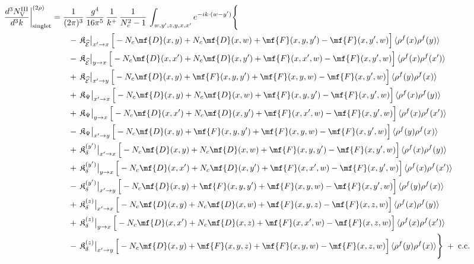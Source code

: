 {\begin{align}
\frac{d^{3}N^{\rm III}_{\rm V}}{d^{3}k}\bigg|^{(2\rho)}_{\rm singlet}&=\frac{1}{(2\pi)^{3}}\,\frac{g^{4}}{16\pi^{5}}\,\frac{1}{k^{+}}\,\frac{1}{N_{c}^{2}-1}\,\int_{w,y',z,y,x,x'}e^{-ik\cdot(w-y')}\Bigg\{\notag\\
&\qquad -\,\mathfrak{K}_{\widehat{\mathcal{E}}}\big|_{x'\to x}\,\Big[-N_{c}\mf{D}(x,y)+N_{c}\mf{D}(x,w)+\mf{F}(x,y,y')-\mf{F}(x,y',w)\Big]\,\langle\rho^{f}(x)\rho^{f}(y)\rangle\notag\\
&\qquad -\,\mathfrak{K}_{\widehat{\mathcal{E}}}\big|_{y\to x}\,\Big[-N_{c}\mf{D}(x,x')+N_{c}\mf{D}(x,y')+\mf{F}(x,x',w)-\mf{F}(x,y',w)\Big]\,\langle\rho^{f}(x)\rho^{f}(x')\rangle\notag\\
&\qquad +\,\mathfrak{K}_{\widehat{\mathcal{E}}}\big|_{x'\to y}\,\Big[-N_{c}\mf{D}(x,y)+\mf{F}(x,y,y')+\mf{F}(x,y,w)-\mf{F}(x,y',w)\Big]\,\langle\rho^{f}(y)\rho^{f}(x)\rangle\notag\\
&\qquad +\,\mathfrak{K}_{\Psi}\big|_{x'\to x}\,\Big[-N_{c}\mf{D}(x,y)+N_{c}\mf{D}(x,w)+\mf{F}(x,y,y')-\mf{F}(x,y',w)\Big]\,\langle\rho^{f}(x)\rho^{f}(y)\rangle\notag\\
&\qquad +\,\mathfrak{K}_{\Psi}\big|_{y\to x}\,\Big[-N_{c}\mf{D}(x,x')+N_{c}\mf{D}(x,y')+\mf{F}(x,x',w)-\mf{F}(x,y',w)\Big]\,\langle\rho^{f}(x)\rho^{f}(x')\rangle\notag\\
&\qquad -\,\mathfrak{K}_{\Psi}\big|_{x'\to y}\,\Big[-N_{c}\mf{D}(x,y)+\mf{F}(x,y,y')+\mf{F}(x,y,w)-\mf{F}(x,y',w)\Big]\,\langle\rho^{f}(y)\rho^{f}(x)\rangle\notag\\
&\qquad +\,\mathfrak{K}_{\delta}^{(y')}\big|_{x'\to x}\,\Big[-N_{c}\mf{D}(x,y)+N_{c}\mf{D}(x,w)+\mf{F}(x,y,y')-\mf{F}(x,y',w)\Big]\,\langle\rho^{f}(x)\rho^{f}(y)\rangle\notag\\
&\qquad +\,\mathfrak{K}_{\delta}^{(y')}\big|_{y\to x}\,\Big[-N_{c}\mf{D}(x,x')+N_{c}\mf{D}(x,y')+\mf{F}(x,x',w)-\mf{F}(x,y',w)\Big]\,\langle\rho^{f}(x)\rho^{f}(x')\rangle\notag\\
&\qquad -\,\mathfrak{K}_{\delta}^{(y')}\big|_{x'\to y}\,\Big[-N_{c}\mf{D}(x,y)+\mf{F}(x,y,y')+\mf{F}(x,y,w)-\mf{F}(x,y',w)\Big]\,\langle\rho^{f}(y)\rho^{f}(x)\rangle\notag\\
&\qquad +\,\mathfrak{K}_{\delta}^{(z)}\big|_{x'\to x}\,\Big[-N_{c}\mf{D}(x,y)+N_{c}\mf{D}(x,w)+\mf{F}(x,y,z)-\mf{F}(x,z,w)\Big]\,\langle\rho^{f}(x)\rho^{f}(y)\rangle\notag\\
&\qquad +\,\mathfrak{K}_{\delta}^{(z)}\big|_{y\to x}\,\Big[-N_{c}\mf{D}(x,x')+N_{c}\mf{D}(x,z)+\mf{F}(x,x',w)-\mf{F}(x,z,w)\Big]\,\langle\rho^{f}(x)\rho^{f}(x')\rangle\notag\\
&\qquad -\,\mathfrak{K}_{\delta}^{(z)}\big|_{x'\to y}\,\Big[-N_{c}\mf{D}(x,y)+\mf{F}(x,y,z)+\mf{F}(x,y,w)-\mf{F}(x,z,w)\Big]\,\langle\rho^{f}(y)\rho^{f}(x)\rangle\Bigg\}\;+\;{\rm c.c.}\label{eq:s-III-V}
\end{align}

}
